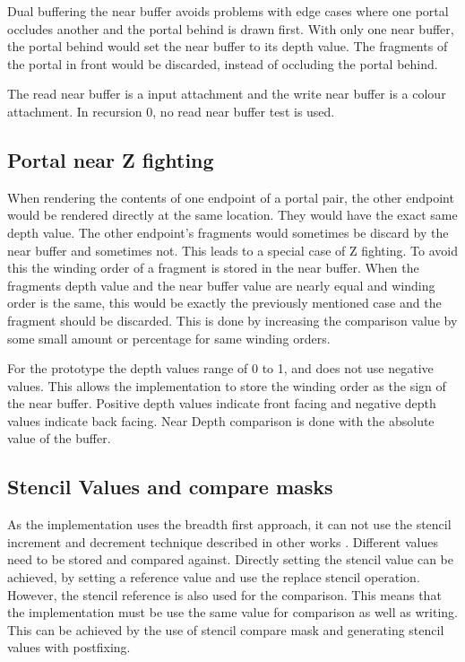 Dual buffering the near buffer avoids problems with edge cases where one portal occludes another and the portal behind is drawn first. With only one near buffer, the portal behind would set the near buffer to its depth value. The fragments of the portal in front would be discarded, instead of occluding the portal behind.

The read near buffer is a input attachment and the write near buffer is a colour attachment. In recursion 0, no read near buffer test is used.

\subsection{Portal near Z fighting}
\label{section:portalzfighting}
When rendering the contents of one endpoint of a portal pair, the other endpoint would be rendered directly at the same location. They would have the exact same depth value. The other endpoint's fragments would sometimes be discard by the near buffer and sometimes not. This leads to a special case of Z fighting. To avoid this the winding order of a fragment is stored in the near buffer. When the fragments depth value and the near buffer value are nearly equal and winding order is the same, this would be exactly the previously mentioned case and the fragment should be discarded. This is done by increasing the comparison value by some small amount or percentage for same winding orders.

For the prototype the depth values range of 0 to 1, and does not use negative values. This allows the implementation to store the winding order as the sign of the near buffer. Positive depth values indicate front facing and negative depth values indicate back facing. Near Depth comparison is done with the absolute value of the buffer.

\subsection{Stencil Values and compare masks}
\label{section:stencilcomparemasks}

As the implementation uses the breadth first approach, it can not use the stencil increment and decrement technique described in other works \cite{schmalstieg:1999:sewing, lowe:2003:fragment, lecture:portalProblems}. Different values need to be stored and compared against. Directly setting the stencil value can be achieved, by setting a reference value and use the replace stencil operation. However, the stencil reference is also used for the comparison. This means that the implementation must be use the same value for comparison as well as writing. This can be achieved by the use of stencil compare mask and generating stencil values with postfixing.

